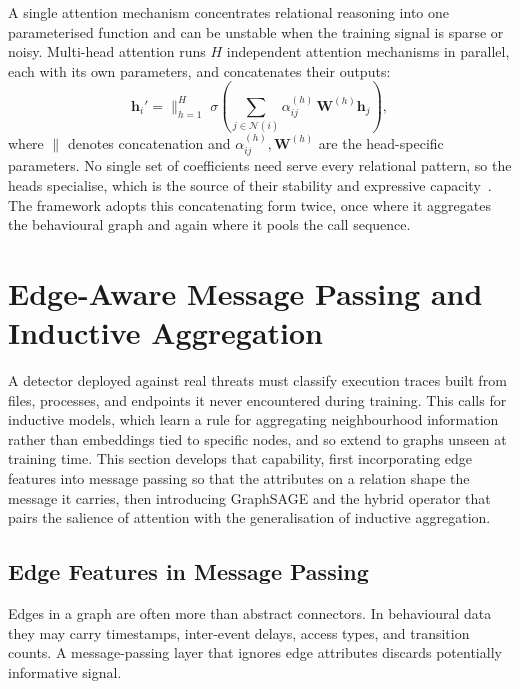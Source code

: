 \documentclass[%
    BCOR=10mm,
    DIV=13,
    toc=bibliography,
    toc=listof,
    oneside,
    12pt,
]{scrbook}
\begin{document}
A single attention mechanism concentrates relational reasoning into one
parameterised function and can be unstable when the training signal is sparse
or noisy. Multi-head attention runs $H$ independent attention mechanisms in
parallel, each with its own parameters, and concatenates their outputs:
\begin{equation} \mathbf{h}_i' = \Big\|_{h=1}^{H}\; \sigma\!\left( \sum_{j \in
\mathcal{N}(i)} \alpha_{ij}^{(h)}\, \mathbf{W}^{(h)} \mathbf{h}_j \right),
\label{eq:multihead} \end{equation} where $\|$ denotes concatenation and
$\alpha_{ij}^{(h)}, \mathbf{W}^{(h)}$ are the head-specific parameters. No
single set of coefficients need serve every relational pattern, so the heads
specialise, which is the source of their stability and expressive
capacity~\cite{velickovic2018gat, vaswani2017}. The framework adopts this
concatenating form twice, once where it aggregates the behavioural graph and
again where it pools the call sequence.

\section{Edge-Aware Message Passing and Inductive Aggregation}
\label{sec:edge_inductive}

A detector deployed against real threats must classify execution traces built
from files, processes, and endpoints it never encountered during training. This
calls for inductive models, which learn a rule for aggregating neighbourhood
information rather than embeddings tied to specific nodes, and so extend to
graphs unseen at training time. This section develops that capability, first
incorporating edge features into message passing so that the attributes on a
relation shape the message it carries, then introducing GraphSAGE and the
hybrid operator that pairs the salience of attention with the generalisation of
inductive aggregation.

\subsection{Edge Features in Message Passing}
\label{subsec:edge_features}

Edges in a graph are often more than abstract connectors. In behavioural data
they may carry timestamps, inter-event delays, access types, and transition
counts. A message-passing layer that
ignores edge attributes discards potentially informative signal.
\end{document}
